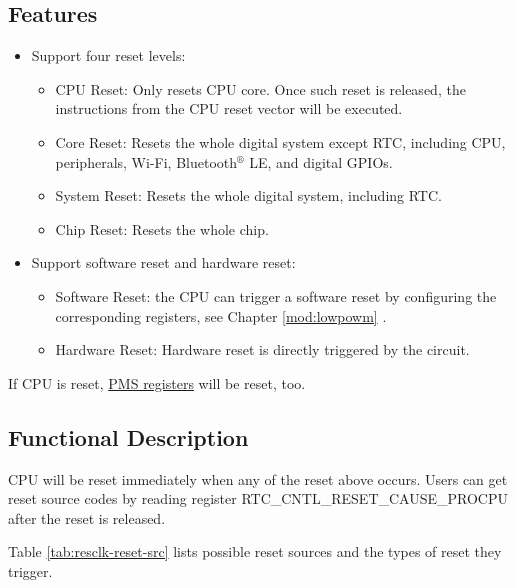 \documentclass[main\_\_EN.tex]{subfiles}
\begin{document}
\subsection{Features}
\begin{itemize}
    \item Support four reset levels:
    \begin{itemize}
    \item CPU Reset: Only resets CPU core. Once such reset is released, the instructions from the CPU reset vector will be executed.
    \item Core Reset: Resets the whole digital system except RTC, including CPU, peripherals, Wi-Fi, Bluetooth$^®$ LE, and digital GPIOs.
    \item System Reset: Resets the whole digital system, including RTC.
    \item Chip Reset: Resets the whole chip.
    \end{itemize}
    \item Support software reset and hardware reset:
    \begin{itemize}
        \item Software Reset: the CPU can trigger a software reset by configuring the corresponding registers, see Chapter \ref{mod:lowpowm} \textit{}.
        \item Hardware Reset: Hardware reset is directly triggered by the circuit.
    \end{itemize}
\end{itemize}
\begin{tiplisting}
If CPU is reset, \hyperref[mod:permctrl]{PMS registers} will be reset, too.
\end{tiplisting}

\vspace{-2em}
\subsection{Functional Description}
CPU will be reset immediately when any of the reset above occurs. Users can get reset source codes by reading register RTC\_CNTL\_RESET\_CAUSE\_PROCPU after the reset is released.

Table \ref{tab:resclk-reset-src} lists possible reset sources and the types of reset they trigger.
\end{document}
